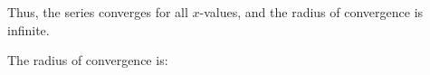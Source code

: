 \documentclass{ximera}
\begin{document}
\begin{exercise}
\begin{hint}
\begin{question}
\begin{question}
\begin{question}
Thus, the series converges for all $x$-values, and the radius of convergence is infinite.
 
 \end{question}
 \end{question}
 \end{question}
\end{hint}

\begin{exercise}
The radius of convergence is:
\begin{multipleChoice}
\choice[correct]{$(-\infty,\infty)$}
\end{multipleChoice}

\end{exercise}
\end{exercise}
\end{document}
